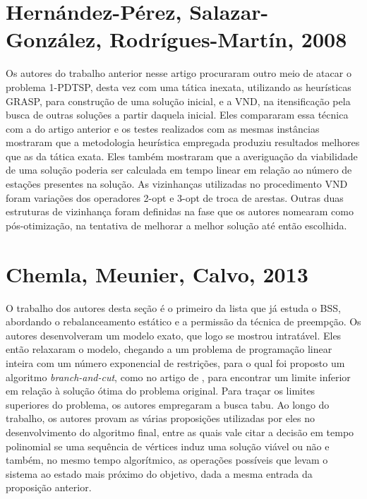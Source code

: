 \section{Hernández-Pérez, Salazar-González, Rodrígues-Martín, 2008}\label{sec:LABEL_CHP_2_SEC_B}

Os autores do trabalho anterior nesse artigo procuraram outro meio de atacar o problema 1-PDTSP, desta vez com uma tática inexata, utilizando as heurísticas GRASP, para construção de uma solução inicial, e a VND, na itensificação pela busca de outras soluções a partir daquela inicial. Eles compararam essa técnica com a do artigo anterior e os testes realizados com as mesmas instâncias mostraram que a metodologia heurística empregada produziu resultados melhores que as da tática exata. Eles também mostraram que a averiguação da viabilidade de uma solução poderia ser calculada em tempo linear em relação ao número de estações presentes na solução. As vizinhanças utilizadas no procedimento VND foram variações dos operadores 2-opt e 3-opt de troca de arestas. Outras duas estruturas de vizinhança foram definidas na fase que os autores nomearam como pós-otimização, na tentativa de melhorar a melhor solução até então escolhida.

\section{Chemla, Meunier, Calvo, 2013}\label{sec:LABEL_CHP_2_SEC_C}

O trabalho dos autores desta seção é o primeiro da lista que já estuda o BSS, abordando o rebalanceamento estático e a permissão da técnica de preempção. Os autores desenvolveram um modelo exato, que logo se mostrou intratável. Eles então relaxaram o modelo, chegando a um problema de programação linear inteira com um número exponencial de restrições, para o qual foi proposto um algoritmo \textit{branch-and-cut}, como no artigo de \citet{art:REF_ART_3}, para encontrar um limite inferior em relação à solução ótima do problema original. Para traçar os limites superiores do problema, os autores empregaram a busca tabu. Ao longo do trabalho, os autores provam as várias proposições utilizadas por eles no desenvolvimento do algoritmo final, entre as quais vale citar a decisão em tempo polinomial se uma sequência de vértices induz uma solução viável ou não e também, no mesmo tempo algorítmico, as operações possíveis que levam o sistema ao estado mais próximo do objetivo, dada a mesma entrada da proposição anterior.

